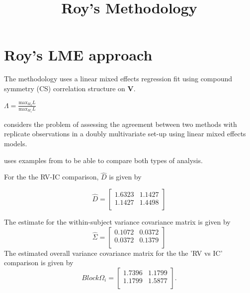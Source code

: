 \documentclass[12pt, a4paper]{article}
\title{Roy's Methodology}
\author{ } \date{ }
\theoremstyle{plain}
\theoremstyle{definition}
\theoremstyle{remark}
\begin{document}
\tableofcontents
\newpage
\section{Roy's LME approach}

\newpage



The methodology uses a linear mixed effects regression fit using
compound symmetry (CS) correlation structure on \textbf{V}.


$\Lambda = \frac{\mbox{max}_{H_{0}}L}{\mbox{max}_{H_{1}}L}$

\newpage

\citet{ARoy2009} considers the problem of assessing the agreement
between two methods with replicate observations in a doubly
multivariate set-up using linear mixed effects models.


\citet{ARoy2009} uses examples from \citet{BA86} to be able to
compare both types of analysis.



For the the RV-IC comparison, $\hat{D}$ is given by


\begin{equation}
\hat{D}= \left[ \begin{array}{cc}
  1.6323 & 1.1427  \\
  1.1427 & 1.4498 \\
\end{array} \right]
\end{equation}

The estimate for the within-subject variance covariance matrix is
given by
\begin{equation}
\hat{\Sigma}= \left[ \begin{array}{cc}
  0.1072 & 0.0372  \\
  0.0372 & 0.1379  \\
\end{array}\right]
\end{equation}
The estimated overall variance covariance matrix for the the 'RV
vs IC' comparison is given by
\begin{equation}
Block \Omega_{i}= \left[ \begin{array}{cc}
  1.7396 & 1.1799  \\
  1.1799 & 1.5877  \\
\end{array} \right].
\end{equation}
\end{document}
